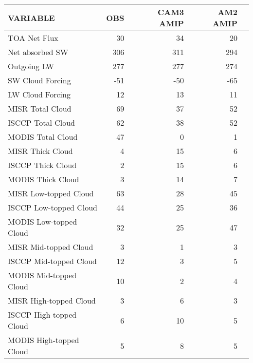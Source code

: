 \begin{tabular}{lrrrr}
\hline
                VARIABLE &                      OBS &                CAM3 AMIP &                 AM2 AMIP \\ \hline
            TOA Net Flux &                       30 &                       34 &                       20 \\
         Net absorbed SW &                      306 &                      311 &                      294 \\
             Outgoing LW &                      277 &                      277 &                      274 \\
        SW Cloud Forcing &                      -51 &                      -50 &                      -65 \\
        LW Cloud Forcing &                       12 &                       13 &                       11 \\
        MISR Total Cloud &                       69 &                       37 &                       52 \\
       ISCCP Total Cloud &                       62 &                       38 &                       52 \\
       MODIS Total Cloud &                       47 &                        0 &                        1 \\
        MISR Thick Cloud &                        4 &                       15 &                        6 \\
       ISCCP Thick Cloud &                        2 &                       15 &                        6 \\
       MODIS Thick Cloud &                        3 &                       14 &                        7 \\
   MISR Low-topped Cloud &                       63 &                       28 &                       45 \\
  ISCCP Low-topped Cloud &                       44 &                       25 &                       36 \\
  MODIS Low-topped Cloud &                       32 &                       25 &                       47 \\
   MISR Mid-topped Cloud &                        3 &                        1 &                        3 \\
  ISCCP Mid-topped Cloud &                       12 &                        3 &                        5 \\
  MODIS Mid-topped Cloud &                       10 &                        2 &                        4 \\
  MISR High-topped Cloud &                        3 &                        6 &                        3 \\
 ISCCP High-topped Cloud &                        6 &                       10 &                        5 \\
 MODIS High-topped Cloud &                        5 &                        8 &                        5 \\ \hline
\end{tabular}
